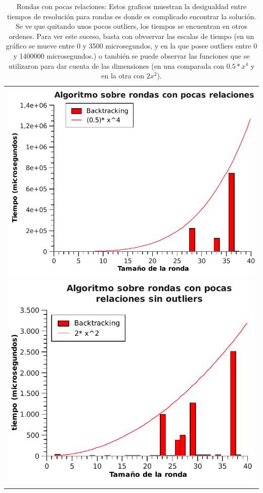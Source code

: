	\begin{table}[ht] %
		\centering %
			\begin{tabular}{c}
				\includegraphics[scale=0.7]{../Ej_2/Otros/Graficos/Graph10-1.pdf} \\
				\includegraphics[scale=0.7]{../Ej_2/Otros/Graficos/Graph10-2.pdf}
				\end{tabular}
				\caption{Rondas con pocas relaciones: Estos graficos muestran la desigualdad entre tiempos de resolución para rondas es donde es complicado encontrar la solución. Se ve que quitando unos pocos outliers, los tiempos se encuentran en otros ordenes. Para ver este suceso, basta con obvservar las escalas de tiempo (en un gráfico se mueve entre 0 y 3500 microsegundos, y en la que posee outliers entre 0 y 1400000 microsegundos.) o también se puede observar las funciones que se utilizaron para dar cuenta de las dimensiones (en una comparada con $0.5*x^4$ y en la otra con $2x^2$).} %
				\label{tiempoEj2a} %
	\end{table}

